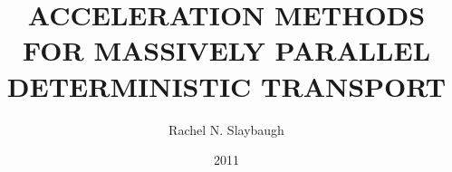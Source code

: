 

\clearpage{}  %



\title{ACCELERATION METHODS FOR MASSIVELY PARALLEL DETERMINISTIC TRANSPORT}
\author{Rachel N. Slaybaugh}
\date{2011}
\maketitle

\copyrightpage


